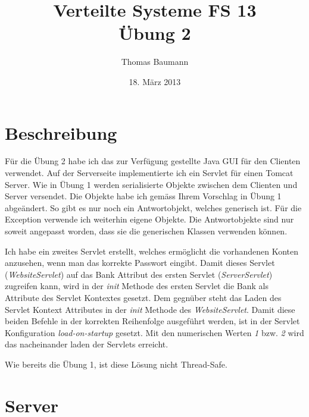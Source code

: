 \documentclass[10pt]{article}
\title{
	\vspace{5cm}
	Verteilte Systeme FS 13\\
	Übung 2
}
\author{Thomas Baumann}
\date{18. März 2013}
\newcommand{\Kursiv}[1]{\textit{#1}} %
\let\stdsection\section{}
\renewcommand{\section}{\newpage\stdsection}
\begin{document}
\maketitle
\thispagestyle{fancy}

\newpage

\tableofcontents	  	


\newpage
\setcounter{page}{1}

\section{Beschreibung}
Für die Übung 2 habe ich das zur Verfügung gestellte Java GUI für den Clienten verwendet. 
Auf der Serverseite implementierte ich ein Servlet für einen Tomcat Server. Wie in Übung 1
werden serialisierte Objekte zwischen dem Clienten und Server versendet. Die Objekte 
habe ich gemäss Ihrem Vorschlag in Übung 1 abgeändert. So gibt es nur noch ein 
Antwortobjekt, welches generisch ist. Für die Exception verwende ich weiterhin eigene 
Objekte. Die Antwortobjekte sind nur soweit angepasst worden, dass sie die generischen 
Klassen verwenden können.

Ich habe ein zweites Servlet erstellt, welches ermöglicht die vorhandenen Konten anzusehen, 
wenn man das korrekte Passwort eingibt. Damit dieses Servlet (\Kursiv{WebsiteServlet}) auf 
das Bank Attribut des ersten Servlet (\Kursiv{ServerServlet}) zugreifen kann, wird in der 
\Kursiv{init} Methode des ersten Servlet die Bank als Attribute des Servlet Kontextes 
gesetzt. Dem gegnüber steht das Laden des Servlet Kontext Attributes in der \Kursiv{init} 
Methode des \Kursiv{WebsiteServlet}. Damit diese beiden Befehle in der korrekten 
Reihenfolge ausgeführt werden, ist in der Servlet Konfiguration \Kursiv{load-on-startup} 
gesetzt. Mit den numerischen Werten \Kursiv{1} bzw. \Kursiv{2} wird das nacheinander laden 
der Servlets erreicht.

Wie bereits die Übung 1, ist diese Lösung nicht Thread-Safe.

\section{Server}



\end{document}
